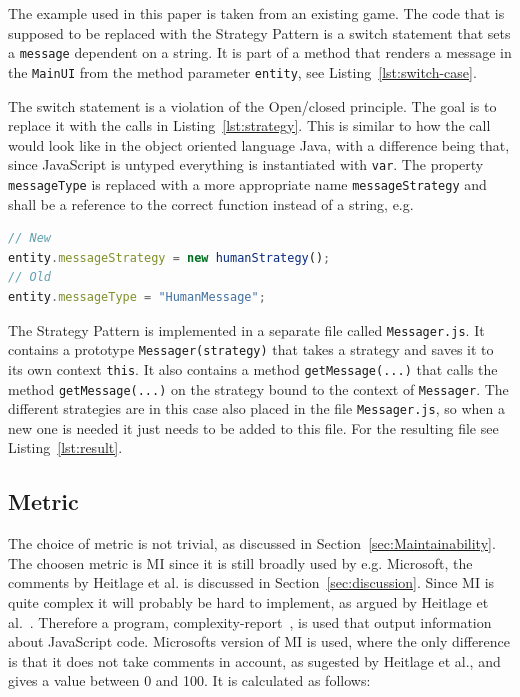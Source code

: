 \documentclass[conference, a4paper]{IEEEtran}
\begin{document}
The example used in this paper is taken from an existing game. The code that is supposed to be replaced with the Strategy Pattern is a switch statement that sets a \texttt{message} dependent on a string. It is part of a method that renders a message in the \texttt{MainUI} from the method parameter \texttt{entity}, see Listing~\ref{lst:switch-case}.

The switch statement is a violation of the Open/closed principle. The goal is to replace it with the calls in Listing~\ref{lst:strategy}. This is similar to how the call would look like in the object oriented language Java, with a difference being that, since JavaScript is untyped everything is instantiated with \texttt{var}. The property \texttt{messageType} is replaced with a more appropriate name \texttt{messageStrategy} and shall be a reference to the correct function instead of a string, e.g.

\begin{lstlisting}[language=JavaScript]
// New
entity.messageStrategy = new humanStrategy();
// Old
entity.messageType = "HumanMessage";
\end{lstlisting}

The Strategy Pattern is implemented in a separate file called \texttt{Messager.js}. It contains a prototype \texttt{Messager(strategy)} that takes a strategy and saves it to its own context \texttt{this}. It also contains a method \texttt{getMessage(...)} that calls the method \texttt{getMessage(...)} on the strategy bound to the context of \texttt{Messager}. The different strategies are in this case also placed in the file \texttt{Messager.js}, so when a new one is needed it just needs to be added to this file. For the resulting file see Listing~\ref{lst:result}.

\subsection{Metric}
The choice of metric is not trivial, as discussed in Section~\ref{sec:Maintainability}. The choosen metric is MI since it is still broadly used by e.g. Microsoft, the comments by Heitlage et al. is discussed in Section~\ref{sec:discussion}.  Since MI is quite complex it will probably be hard to implement, as argued by Heitlage et al.~\cite{bibitem:Maintainability}. Therefore a program, complexity-report~\cite{bibitem:complexity-report}, is used that output information about JavaScript code.  Microsofts version of MI is used, where the only difference is that it does not take comments in account, as sugested by Heitlage et al., and gives a value between 0 and 100. It is calculated as follows:
\end{document}
